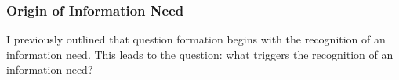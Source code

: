 


\subsubsection{Origin of Information Need}
I previously outlined that question formation begins with the recognition of an information need. This leads to the question: what triggers the recognition of an information need?

